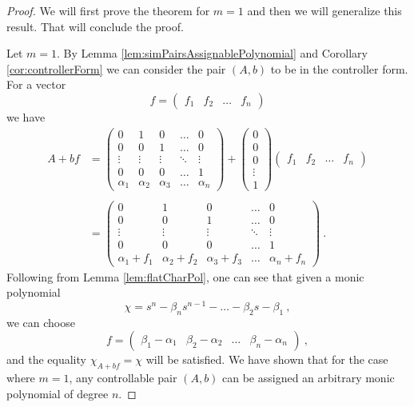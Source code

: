 \begin{proof}
    We will first prove the theorem for $m=1$ and then we will generalize this result. That will conclude the proof.

    Let $m=1$. By Lemma \ref{lem:simPairsAssignablePolynomial} and Corollary \ref{cor:controllerForm} we can consider the pair $(A,b)$ to be in the controller form. For a vector 
    \begin{equation*}
        f=\begin{pmatrix}
            f_1&f_2&\ldots&f_n
        \end{pmatrix}
    \end{equation*}
    we have 
    \begin{align*}
        A+bf&=
        \begin{pmatrix}
			0 & 1 & 0 & \ldots & 0 \\
			0 & 0 & 1 & \ldots & 0 \\
			\vdots & \vdots & \vdots & \ddots & \vdots \\
			0 & 0 & 0 & \ldots & 1 \\
			\alpha_1 & \alpha_2 & \alpha_3 & \ldots & \alpha_n
        \end{pmatrix}
        +
        \begin{pmatrix}
            0 \\
            0 \\
            0 \\
            \vdots \\
            1
        \end{pmatrix}
        \begin{pmatrix}
            f_1&f_2&\ldots&f_n
        \end{pmatrix}
        \\
        \\
        &=
        \begin{pmatrix}
			0 & 1 & 0 & \ldots & 0 \\
			0 & 0 & 1 & \ldots & 0 \\
			\vdots & \vdots & \vdots & \ddots & \vdots \\
			0 & 0 & 0 & \ldots & 1 \\
            \alpha_1+f_1 & \alpha_2+f_2 & \alpha_3+f_3 & \ldots & \alpha_n+f_n
        \end{pmatrix}\ .
    \end{align*}
    Following from Lemma \ref{lem:flatCharPol}, one can see that given a monic polynomial
    $$\chi=s^n-\beta_ns^{n-1}-\ldots-\beta_2s-\beta_1\ ,$$
    we can choose
    $$f=\begin{pmatrix}
        \beta_1-\alpha_1&\beta_2-\alpha_2&\ldots&\beta_n-\alpha_n
    \end{pmatrix}\ ,$$
    and the equality $\chi_{A+bf}=\chi$ will be satisfied. We have shown that for the case where $m=1$, any controllable pair $(A,b)$ can be assigned an arbitrary monic polynomial of degree $n$.


\end{proof}
